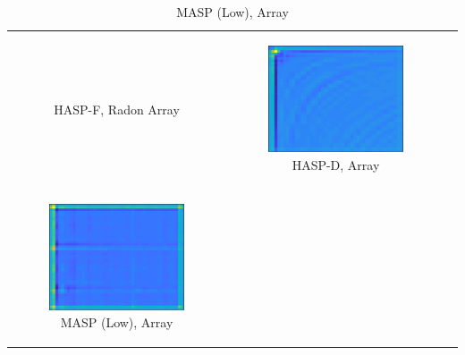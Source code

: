 {\begin{table}[tb]
\begin{tabular}{ccc}
\begin{subfigure}{0.3\textwidth}
		\caption{HASP-F, Radon Array}\label{fig:cnnfc7}
		\end{subfigure}&
		\begin{subfigure}{0.3\textwidth}\centering\includegraphics[width=0.8\columnwidth]{./dasp_algorithm_results/dasp_cnn_single_dream_fc_8.eps}
		\caption{HASP-D, Array}\label{fig:cnnfc8}
		\end{subfigure}    \\
		\begin{subfigure}{0.3\textwidth}\centering\includegraphics[width=0.8\columnwidth]{./dasp_algorithm_results/dasp_cnn_single_dream_fc_9.eps}
		\caption{MASP (Low), Array}\label{fig:cnnfc9}
		\end{subfigure}&

\end{tabular}
\end{table}}
